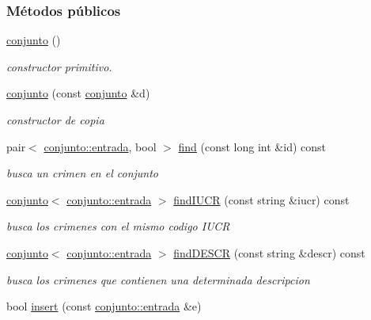 \subsubsection*{Métodos públicos}
\begin{DoxyCompactItemize}
\item 
\hyperlink{classconjunto_a16d987f42c679efab01748178ba45891}{conjunto} ()
\begin{DoxyCompactList}\small\item\em constructor primitivo. \end{DoxyCompactList}\item 
\hyperlink{classconjunto_ab0944b1f9a0c959ca314ce0debd5def9}{conjunto} (const \hyperlink{classconjunto}{conjunto} \&d)
\begin{DoxyCompactList}\small\item\em constructor de copia \end{DoxyCompactList}\item 
pair$<$ \hyperlink{classconjunto_a09cad766dd65de73e51eae21f9d22585}{conjunto\+::entrada}, bool $>$ \hyperlink{classconjunto_a64ee1c67331bce15dc029048631dda97}{find} (const long int \&id) const 
\begin{DoxyCompactList}\small\item\em busca un crimen en el conjunto \end{DoxyCompactList}\item 
\hyperlink{classconjunto}{conjunto}$<$ \hyperlink{classconjunto_a09cad766dd65de73e51eae21f9d22585}{conjunto\+::entrada} $>$ \hyperlink{classconjunto_a50eb93f152dc973726d184733d7ecd98}{find\+I\+U\+C\+R} (const string \&iucr) const 
\begin{DoxyCompactList}\small\item\em busca los crimenes con el mismo codigo I\+U\+C\+R \end{DoxyCompactList}\item 
\hyperlink{classconjunto}{conjunto}$<$ \hyperlink{classconjunto_a09cad766dd65de73e51eae21f9d22585}{conjunto\+::entrada} $>$ \hyperlink{classconjunto_a5190c59db573008cc48a8ce734954a96}{find\+D\+E\+S\+C\+R} (const string \&descr) const 
\begin{DoxyCompactList}\small\item\em busca los crimenes que contienen una determinada descripcion \end{DoxyCompactList}\item 
bool \hyperlink{classconjunto_aa65b9f7c4cb9bad6d4e40c1973095930}{insert} (const \hyperlink{classconjunto_a09cad766dd65de73e51eae21f9d22585}{conjunto\+::entrada} \&e)

\end{DoxyCompactItemize}
